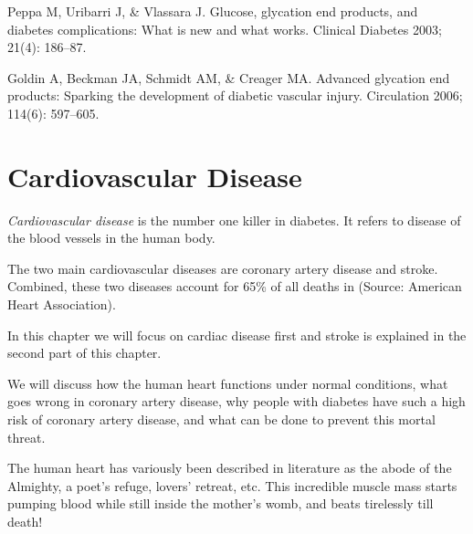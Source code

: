 \begin{thebibliography}{99}
 Peppa M, Uribarri J, \& Vlassara J. Glucose, glycation end products, and diabetes complications: What is new and what works. Clinical Diabetes 2003; 21(4): 186–87.

  Goldin A, Beckman JA, Schmidt AM, \& Creager MA. Advanced glycation end products: Sparking the development of diabetic vascular injury. Circulation 2006; 114(6): 597–605.

 \end{thebibliography}


\chapter{Cardiovascular Disease}

\textit{Cardiovascular disease} is the number one killer in diabetes. It refers to disease of the blood vessels in the human body. 

The two main cardiovascular diseases are coronary artery disease and stroke. Combined, these two diseases account for 65\% of all deaths in  (Source: American Heart Association). 

In this chapter we will focus on cardiac disease first and stroke is explained in the second part of this chapter.

We will discuss how the human heart functions under normal conditions, what goes wrong in coronary artery disease, why people with diabetes have such a high risk of coronary artery disease, and what can be done to prevent this mortal threat.


The human heart has variously been described in literature as the abode of the Almighty, a poet’s refuge, lovers’ retreat, etc. This incredible muscle mass starts pumping blood while still inside the mother’s womb, and beats tirelessly till death!

